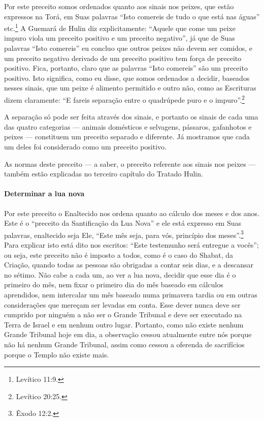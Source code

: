 Por este preceito somos ordenados quanto aos sinais nos peixes, que
estão expressos na Torá, em Suas palavras ``Isto comereis de tudo o que
está nas águas'' etc.\footnote{Levítico 11:9.} A Guemará de Hulin diz
explicitamente: ``Aquele que come um peixe impuro viola um preceito
positivo e um preceito negativo'', já que de Suas palavras ``Isto
comereis'' eu concluo que outros peixes não devem ser comidos, e um
preceito negativo derivado de um preceito positivo tem força de preceito
positivo. Fica, portanto, claro que as palavras ``Isto comereis'' são
um preceito positivo. Isto significa, como eu disse, que somos
ordenados a decidir, baseados nesses sinais, que um peixe é alimento
permitido e outro não, como as Escrituras dizem claramente: ``E fareis
separação entre o quadrúpede puro e o impuro''.\footnote{Levítico 20:25.}

A separação só pode ser feita através dos sinais, e portanto os sinais
de cada uma das quatro categorias --- animais domésticos e selvagens,
pássaros, gafanhotos e peixes --- constituem um preceito separado e
diferente. Já mostramos que cada um deles foi considerado como um
preceito positivo.

As normas deste preceito --- a saber, o preceito referente aos sinais
nos peixes --- também estão explicadas no terceiro capítulo do Tratado
Hulin.

\paragraph{Determinar a lua nova}

Por este preceito o Enaltecido nos ordena quanto ao cálculo dos meses e
dos anos. Este é o ``preceito da Santificação da Lua Nova'' e ele está
expresso em Suas palavras, enaltecido seja Ele, ``Este mês seja, para
vós, princípio dos meses''.\footnote{Êxodo 12:2.} Para explicar isto está dito
nos escritos: ``Este testemunho será entregue a vocês''; ou seja, este preceito não é imposto a
todos, como é o caso do Shabat, da Criação, quando todas as pessoas são
obrigadas a contar seis dias, e a descansar no sétimo. Não cabe a cada
um, ao ver a lua nova, decidir que esse dia é o primeiro do mês, nem
fixar o primeiro dia do mês baseado em cálculos aprendidos, nem
intercalar um mês baseado numa primavera tardia ou em outras
considerações que mereçam ser levadas em conta. Esse dever nunca deve
ser cumprido por ninguém a não ser o Grande Tribunal e deve ser
executado na Terra de Israel e em nenhum outro lugar. Portanto, como
não existe nenhum Grande Tribunal hoje em dia, a observação cessou
atualmente entre nós porque não há nenhum Grande Tribunal, assim como
cessou a oferenda de sacrifícios porque o Templo não existe mais.

